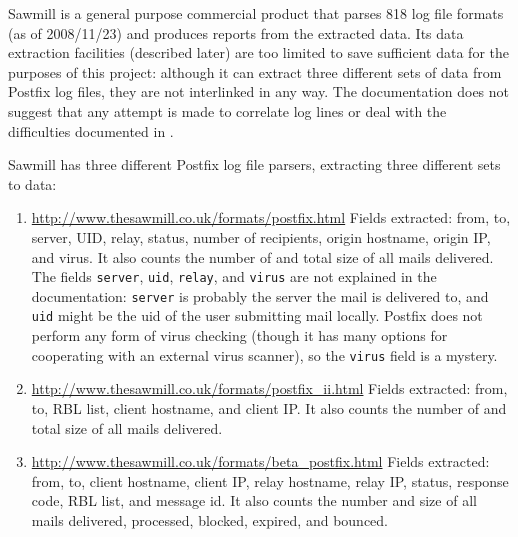 Sawmill is a general purpose commercial product that parses 818 log file
formats (as of 2008/11/23) and produces reports from the extracted data.
Its data extraction facilities (described later) are too limited to save
sufficient data for the purposes of this project: although it can extract
three different sets of data from Postfix log files, they are not
interlinked in any way.  The documentation does not suggest that any
attempt is made to correlate log lines or deal with the difficulties
documented in .

Sawmill has three different Postfix log file parsers, extracting three
different sets to data:

\begin{enumerate}

    \item \url{http://www.thesawmill.co.uk/formats/postfix.html} \newline{}
        Fields extracted: from, to, server, UID, relay, status, number of
        recipients, origin hostname, origin \gls{IP}, and virus.  It also
        counts the number of and total size of all mails delivered.  The
        fields \texttt{server}, \texttt{uid}, \texttt{relay}, and
        \texttt{virus} are not explained in the documentation:
        \texttt{server} is probably the server the mail is delivered to,
        and \texttt{uid} might be the uid of the user submitting mail
        locally.  Postfix does not perform any form of virus checking
        (though it has many options for cooperating with an external virus
        scanner), so the \texttt{virus} field is a mystery.

    \item \url{http://www.thesawmill.co.uk/formats/postfix_ii.html}
        \newline{} Fields extracted: from, to, RBL list, client hostname,
        and client \gls{IP}\@.  It also counts the number of and total size
        of all mails delivered.  

    \item \url{http://www.thesawmill.co.uk/formats/beta_postfix.html}
        \newline{} Fields extracted: from, to, client hostname, client
        \gls{IP}, relay hostname, relay \gls{IP}, status, response code,
        RBL list, and message id.  It also counts the number and size of
        all mails delivered, processed, blocked, expired, and bounced.

\end{enumerate}

